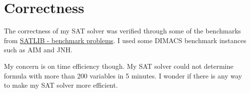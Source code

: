 \documentclass[10pt,a4paper]{article}
\begin{document}
	\section{Correctness}
	
	The correctness of my SAT solver was verified through some of the benchmarks from \href{https://www.cs.ubc.ca/~hoos/SATLIB/benchm.html}{SATLIB - benchmark problems}. I used some DIMACS benchmark instances such as AIM and JNH.
	
	My concern is on time efficiency though. My SAT solver could not determine formula with more than 200 variables in 5 minutes. I wonder if there is any way to make my SAT solver more efficient.
	
	
	
	
\end{document}
